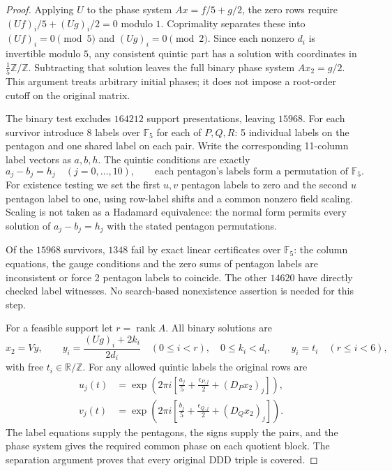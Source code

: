 \documentclass[11pt,a4paper]{article}
\theoremstyle{plain}
\theoremstyle{definition}
\theoremstyle{plain}
\begin{document}
\begin{proof}
Applying $U$ to the phase system $Ax=f/5+g/2$, the zero rows require $(Uf)_i/5+(Ug)_i/2=0$ modulo $1$. Coprimality separates these into $(Uf)_i=0\pmod5$ and $(Ug)_i=0\pmod2$. Since each nonzero $d_i$ is invertible modulo $5$, any consistent quintic part has a solution with coordinates in $\tfrac15\mathbb{Z}/\mathbb{Z}$. Subtracting that solution leaves the full binary phase system $Ax_2=g/2$. This argument treats arbitrary initial phases; it does not impose a root-order cutoff on the original matrix.

\medskip
The binary test excludes $164212$ support presentations, leaving $15968$. For each survivor introduce 8 labels over $\mathbb{F}_5$ for each of $P,Q,R$: 5 individual labels on the pentagon and one shared label on each pair. Write the corresponding 11-column label vectors as $a,b,h$. The quintic conditions are exactly
\[
a_j-b_j=h_j\quad(j=0,\ldots,10),\qquad \text{each pentagon's labels form a permutation of }\mathbb{F}_5.
\]
For existence testing we set the first $u,v$ pentagon labels to zero and the second $u$ pentagon label to one, using row-label shifts and a common nonzero field scaling. Scaling is not taken as a Hadamard equivalence: the normal form permits every solution of $a_j-b_j=h_j$ with the stated pentagon permutations.

Of the $15968$ survivors, $1348$ fail by exact linear certificates over $\mathbb{F}_5$: the column equations, the gauge conditions and the zero sums of pentagon labels are inconsistent or force 2 pentagon labels to coincide. The other $14620$ have directly checked label witnesses. No search-based nonexistence assertion is needed for this step.

For a feasible support let $r=\operatorname{rank}A$. All binary solutions are
\[
x_2=Vy,\qquad y_i=\frac{(Ug)_i+2k_i}{2d_i}\quad(0\le i<r),\quad 0\le k_i<d_i,\qquad y_i=t_i\quad(r\le i<6),
\]
with free $t_i\in\mathbb R/\mathbb{Z}$. For any allowed quintic labels the original rows are
\begin{align*}
u_j(t)&=\exp\!\left(2\pi i\left[\frac{a_j}{5} +\frac{\epsilon_{P,j}}2+(D_Px_2)_j\right]\right),\\
v_j(t)&=\exp\!\left(2\pi i\left[\frac{b_j}{5} +\frac{\epsilon_{Q,j}}2+(D_Qx_2)_j\right]\right).
\end{align*}
The label equations supply the pentagons, the signs supply the pairs, and the phase system gives the required common phase on each quotient block. The separation argument proves that every original $\mathrm{DDD}$ triple is covered.


\end{proof}
\end{document}

